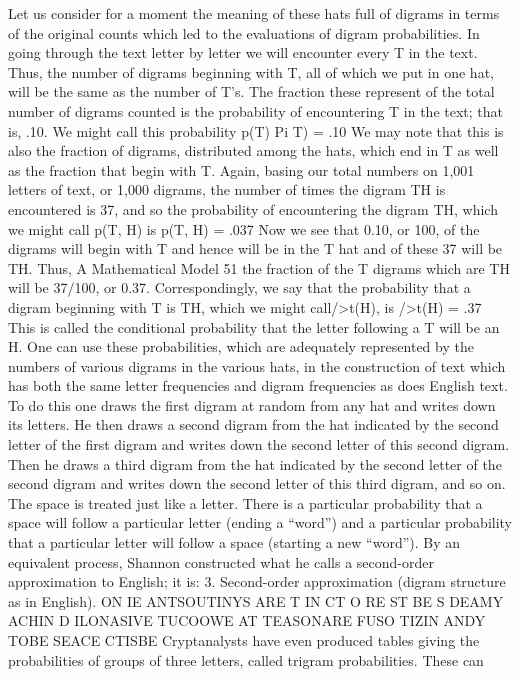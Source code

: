 Let us consider for a moment the meaning of these hats full of
digrams in terms of the original counts which led to the evaluations
of digram probabilities.
In going through the text letter by letter we will encounter every
T in the text. Thus, the number of digrams beginning with T, all
of which we put in one hat, will be the same as the number of T’s.
The fraction these represent of the total number of digrams counted
is the probability of encountering T in the text; that is, .10. We
might call this probability p(T)
Pi T) = .10
We may note that this is also the fraction of digrams, distributed
among the hats, which end in T as well as the fraction that begin
with T.
Again, basing our total numbers on 1,001 letters of text, or
1,000 digrams, the number of times the digram TH is encountered
is 37, and so the probability of encountering the digram TH, which
we might call p(T, H) is
p(T, H) = .037
Now we see that 0.10, or 100, of the digrams will begin with T
and hence will be in the T hat and of these 37 will be TH. Thus,
A Mathematical Model 51
the fraction of the T digrams which are TH will be 37/100, or 0.37.
Correspondingly, we say that the probability that a digram beginning
with T is TH, which we might call/>t(H), is
/>t(H) = .37
This is called the conditional probability that the letter following a
T will be an H.
One can use these probabilities, which are adequately represented
by the numbers of various digrams in the various hats, in
the construction of text which has both the same letter frequencies
and digram frequencies as does English text. To do this one draws
the first digram at random from any hat and writes down its letters.
He then draws a second digram from the hat indicated by the
second letter of the first digram and writes down the second letter
of this second digram. Then he draws a third digram from the hat
indicated by the second letter of the second digram and writes
down the second letter of this third digram, and so on. The space
is treated just like a letter. There is a particular probability that a
space will follow a particular letter (ending a “word”) and a
particular probability that a particular letter will follow a space
(starting a new “word”).
By an equivalent process, Shannon constructed what he calls a
second-order approximation to English; it is:
3. Second-order approximation (digram structure as in English).
ON IE ANTSOUTINYS ARE T IN CT O RE ST BE S
DEAMY ACHIN D ILONASIVE TUCOOWE AT TEASONARE
FUSO TIZIN ANDY TOBE SEACE CTISBE
Cryptanalysts have even produced tables giving the probabilities
of groups of three letters, called trigram probabilities. These can
